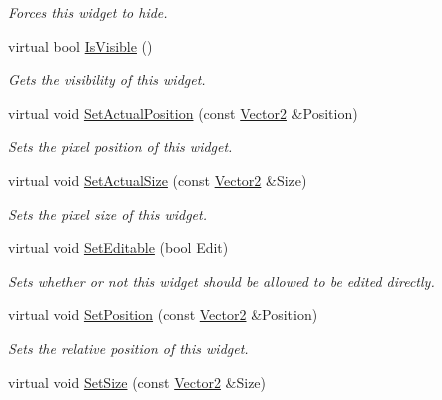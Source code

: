 \begin{DoxyCompactItemize}
\begin{DoxyCompactList}\small\item\em Forces this widget to hide. \item\end{DoxyCompactList}\item 
virtual bool \hyperlink{classphys_1_1UI_1_1Spinner_a3bb14ddd6426debf035e65b9885bc25b}{IsVisible} ()
\begin{DoxyCompactList}\small\item\em Gets the visibility of this widget. \item\end{DoxyCompactList}\item 
virtual void \hyperlink{classphys_1_1UI_1_1Spinner_a66bc26a2252cacd71e8c409e35672909}{SetActualPosition} (const \hyperlink{classphys_1_1Vector2}{Vector2} \&Position)
\begin{DoxyCompactList}\small\item\em Sets the pixel position of this widget. \item\end{DoxyCompactList}\item 
virtual void \hyperlink{classphys_1_1UI_1_1Spinner_a564782cd7135a708295c51e722f22716}{SetActualSize} (const \hyperlink{classphys_1_1Vector2}{Vector2} \&Size)
\begin{DoxyCompactList}\small\item\em Sets the pixel size of this widget. \item\end{DoxyCompactList}\item 
virtual void \hyperlink{classphys_1_1UI_1_1Spinner_abc02184e58175e363e2dfc1148ebd4d7}{SetEditable} (bool Edit)
\begin{DoxyCompactList}\small\item\em Sets whether or not this widget should be allowed to be edited directly. \item\end{DoxyCompactList}\item 
virtual void \hyperlink{classphys_1_1UI_1_1Spinner_a7b520a5aa26772bd15e880887d174fa6}{SetPosition} (const \hyperlink{classphys_1_1Vector2}{Vector2} \&Position)
\begin{DoxyCompactList}\small\item\em Sets the relative position of this widget. \item\end{DoxyCompactList}\item 
virtual void \hyperlink{classphys_1_1UI_1_1Spinner_a01641c5ed2b360307f3056f142964bf4}{SetSize} (const \hyperlink{classphys_1_1Vector2}{Vector2} \&Size)

\end{DoxyCompactItemize}

